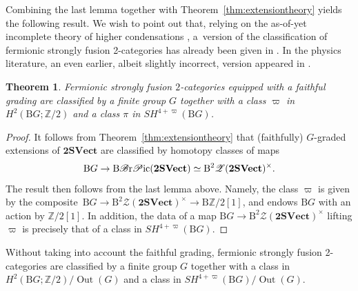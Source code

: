 \documentclass[pdftex]{sigma}
\newtheorem{Theorem}{Theorem}[section]
\numberwithin{equation}{section}
\begin{document}
Combining the last lemma together with Theorem~\ref{thm:extensiontheory} yields the following result. We wish to point out that, relying on the as-of-yet incomplete theory of higher condensations \cite{GJF}, a~version of the classification of fermionic strongly fusion 2-categories has already been given in \cite[Section~V.D]{JF}. In the physics literature, an even earlier, albeit slightly incorrect, version appeared in \cite{LW}.

\begin{Theorem}\label{thm:classificationFSF2Cs}
Fermionic strongly fusion $2$-categories equipped with a faithful grading are classified by a finite group $G$ together with a class $\varpi$ in $H^2(\mathrm{B}G;\mathbb{Z}/2)$ and a class $\pi$ in $SH^{4+\varpi}(\mathrm{B}G)$.
\end{Theorem}
\begin{proof}
It follows from Theorem~\ref{thm:extensiontheory} that (faithfully) $G$-graded extensions of $\mathbf{2SVect}$ are classified by homotopy classes of maps
 \begin{gather*}
\mathrm{B}G\rightarrow \mathrm{B}\mathscr{B}{\rm r}\mathscr{P}{\rm ic}(\mathbf{2SVect})\simeq\mathrm{B}^2\mathscr{Z}(\mathbf{2SVect})^{\times}.
\end{gather*}
 The result then follows from the last lemma above. Namely, the class $\varpi$ is given by the composite~$\mathrm{B}G\rightarrow \mathrm{B}^2\mathscr{Z}(\mathbf{2SVect})^{\times}\rightarrow \mathrm{B}\mathbb{Z}/2[1]$, and endows $\mathrm{B}G$ with an action by $\mathbb{Z}/2[1]$. In addition, the data of a map $\mathrm{B}G\rightarrow \mathrm{B}^2\mathscr{Z}(\mathbf{2SVect})^{\times}$ lifting $\varpi$ is precisely that of a class in $SH^{4+\varpi}(\mathrm{B}G)$.
\end{proof}

\begin{Remark}
Without taking into account the faithful grading, fermionic strongly fusion 2-categories are classified by a finite group $G$ together with a class in $H^2(\mathrm{B}G;\mathbb{Z}/2)/\operatorname{Out}(G)$ and a class in $SH^{4+\varpi}(\mathrm{B}G)/\operatorname{Out}(G)$.
\end{Remark}
\end{document}
